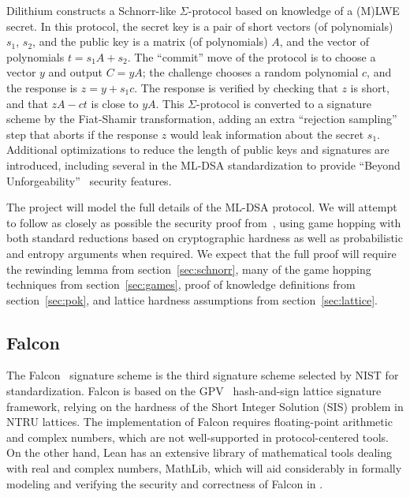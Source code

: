 Dilithium constructs a Schnorr-like $\Sigma$-protocol based on knowledge of a (M)LWE secret.
In this protocol, the secret key is a pair of short vectors (of polynomials) $s_1$, $s_2$, and the public key is a matrix (of polynomials) $A$, and the vector of polynomials $t = s_1A + s_2$.
The ``commit'' move of the protocol is to choose a vector $y$ and output $C = yA$; the challenge chooses a random polynomial $c$, and the response is $z = y + s_1c$.
The response is verified by checking that $z$ is short, and that $zA - ct$ is close to $yA$.
This $\Sigma$-protocol is converted to a signature scheme by the Fiat-Shamir transformation, adding an extra ``rejection sampling'' step that aborts if the response $z$ would leak information about the secret $s_1$.
Additional optimizations to reduce the length of public keys and signatures are introduced, including several in the ML-DSA standardization to provide ``Beyond Unforgeability''~\cite{BUFF} security features.

The project will model the full details of the ML-DSA protocol.  
We will attempt to follow as closely as possible the security proof from~\cite{dilithium3}, using game hopping with both standard reductions based on cryptographic hardness as well as probabilistic and entropy arguments when required. 
We expect that the full proof will require the rewinding lemma from section~\ref{sec:schnorr}, many of the game hopping techniques from section~\ref{sec:games}, proof of knowledge definitions from section~\ref{sec:pok}, and lattice hardness assumptions from section~\ref{sec:lattice}.


\subsection{Falcon}\label{sec:falcon}

The Falcon~\cite{fouque2018falcon} signature scheme is the third signature scheme selected by NIST for standardization.
Falcon is based on the GPV~\cite{GPV} hash-and-sign lattice signature framework, relying on the hardness of the Short Integer Solution (SIS) problem in NTRU lattices.
The implementation of Falcon requires floating-point arithmetic and complex numbers, which are not well-supported in protocol-centered tools.
On the other hand, Lean has an extensive library of mathematical tools dealing with real and complex numbers,  MathLib, which will aid considerably in formally modeling and verifying the security and correctness of Falcon in \vcvio.

